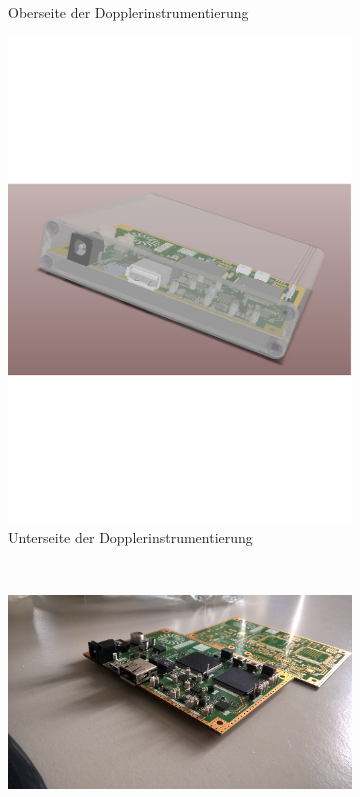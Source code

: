 \begin{figure}[h!]
\begin{subfigure}[b]{0.499\textwidth}
    	\caption{Oberseite der Dopplerinstrumentierung}
	    \label{fig:pcb_top}
	\end{subfigure}%
    \hfil %
    \begin{subfigure}[b]{0.499\textwidth}
    	\includegraphics[page=2, width=\textwidth, trim= 65mm 5mm 65mm 0mm, clip=true]{images/pcb/Job2.PDF}%
    	\caption{Unterseite der Dopplerinstrumentierung}
	    \label{fig:pcb_bottom}
    \end{subfigure}
    \hfil
    ~
    \begin{subfigure}[b]{1\textwidth}
    	\includegraphics[width=\textwidth, trim= 230mm 155mm 0mm 65mm, clip=true]{images/pcb/WP_20150709_002}

\end{subfigure}
\end{figure}
